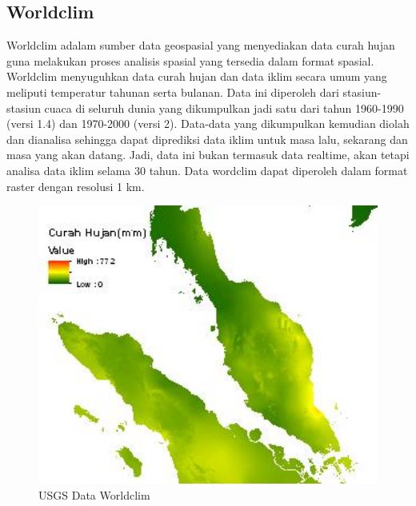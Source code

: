 \subsection{Worldclim}
Worldclim adalam sumber data geospasial yang menyediakan data curah hujan guna melakukan proses analisis spasial yang tersedia dalam format spasial. Worldclim menyuguhkan data curah hujan dan data iklim secara umum yang meliputi temperatur tahunan serta bulanan. Data ini diperoleh dari stasiun-stasiun cuaca di seluruh dunia yang dikumpulkan jadi satu dari tahun 1960-1990 (versi 1.4) dan 1970-2000 (versi 2). Data-data yang dikumpulkan kemudian diolah dan dianalisa sehingga dapat diprediksi data iklim untuk masa lalu, sekarang dan masa yang akan datang. Jadi, data ini bukan termasuk data realtime, akan tetapi analisa data iklim selama 30 tahun. Data wordclim dapat diperoleh dalam format raster dengan resolusi 1 km. 
\begin{figure}[htbp]
\centering
\includegraphics[width=1\textwidth]{pictures/data_worldclim}
\caption{USGS Data Worldclim}
\label{labelgambar3}
\end{figure}


